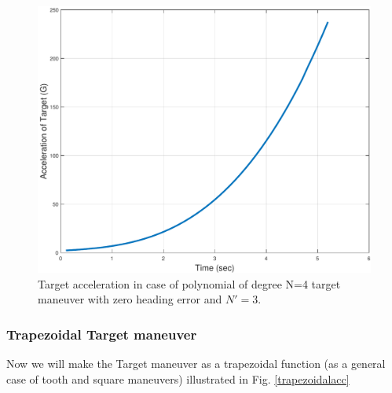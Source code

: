 \begin{figure}[H]
	\centering
	\includegraphics[scale = 0.35]{fig/TargetAccelerationP4N3.pdf}
	\caption{Target acceleration in case of  polynomial of degree N=4 target maneuver with zero heading error and $N'=3$.}
	\label{Target accelerationP4N3}
\end{figure}


%
%


\subsubsection{Trapezoidal Target maneuver}
Now we will make the Target maneuver as a trapezoidal function (as a general case of tooth and square maneuvers) illustrated in Fig. \ref{trapezoidalacc}


